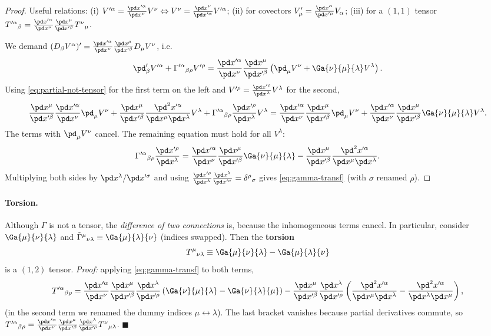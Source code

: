 \begin{proof}
Useful relations: (i) $V'^\alpha=\frac{\pd x'^\alpha}{\pd x^\nu}V^\nu\Leftrightarrow V^\nu=\frac{\pd x^\nu}{\pd x'^\alpha}V'^\alpha$; (ii) for covectors $V'_\mu=\frac{\pd x^\alpha}{\pd x'^\mu}V_\alpha$; (iii) for a $(1,1)$ tensor $T'^\alpha{}_\beta=\frac{\pd x'^\alpha}{\pd x^\nu}\frac{\pd x^\mu}{\pd x'^\beta}T^\nu{}_\mu$.

We demand $(D_\beta V^\alpha)'=\frac{\pd x'^\alpha}{\pd x^\nu}\frac{\pd x^\mu}{\pd x'^\beta}D_\mu V^\nu$, i.e.
\[
  \pd'_\beta V'^\alpha+\Gamma'^\alpha{}_{\beta\rho}V'^\rho
  =\frac{\pd x'^\alpha}{\pd x^\nu}\frac{\pd x^\mu}{\pd x'^\beta}\left(\pd_\mu V^\nu+\Ga{\nu}{\mu}{\lambda}V^\lambda\right).
\]
Using \eqref{eq:partial-not-tensor} for the first term on the left and $V'^\rho=\frac{\pd x'^\rho}{\pd x^\lambda}V^\lambda$ for the second,
\[
  \frac{\pd x^\mu}{\pd x'^\beta}\frac{\pd x'^\alpha}{\pd x^\nu}\pd_\mu V^\nu
  +\frac{\pd x^\mu}{\pd x'^\beta}\frac{\pd^2x'^\alpha}{\pd x^\mu\pd x^\lambda}V^\lambda
  +\Gamma'^\alpha{}_{\beta\rho}\frac{\pd x'^\rho}{\pd x^\lambda}V^\lambda
  =\frac{\pd x'^\alpha}{\pd x^\nu}\frac{\pd x^\mu}{\pd x'^\beta}\pd_\mu V^\nu+\frac{\pd x'^\alpha}{\pd x^\nu}\frac{\pd x^\mu}{\pd x'^\beta}\Ga{\nu}{\mu}{\lambda}V^\lambda .
\]
The terms with $\pd_\mu V^\nu$ cancel. The remaining equation must hold for all $V^\lambda$:
\[
  \Gamma'^\alpha{}_{\beta\rho}\frac{\pd x'^\rho}{\pd x^\lambda}
  =\frac{\pd x'^\alpha}{\pd x^\nu}\frac{\pd x^\mu}{\pd x'^\beta}\Ga{\nu}{\mu}{\lambda}-\frac{\pd x^\mu}{\pd x'^\beta}\frac{\pd^2x'^\alpha}{\pd x^\mu\pd x^\lambda}.
\]
Multiplying both sides by $\pd x^\lambda/\pd x'^\sigma$ and using $\frac{\pd x'^\rho}{\pd x^\lambda}\frac{\pd x^\lambda}{\pd x'^\sigma}=\delta^\rho{}_\sigma$ gives \eqref{eq:gamma-transf} (with $\sigma$ renamed $\rho$).
\end{proof}

\paragraph{Torsion.} Although $\Gamma$ is not a tensor, the \emph{difference of two connections} is, because the inhomogeneous terms cancel. In particular, consider $\Ga{\mu}{\nu}{\lambda}$ and $\tilde\Gamma^\mu{}_{\nu\lambda}\equiv\Ga{\mu}{\lambda}{\nu}$ (indices swapped). Then the \textbf{torsion}
\begin{equation}
  T^\mu{}_{\nu\lambda}\equiv\Ga{\mu}{\nu}{\lambda}-\Ga{\mu}{\lambda}{\nu}
\end{equation}
is a $(1,2)$ tensor. \textit{Proof:} applying \eqref{eq:gamma-transf} to both terms,
\[
  T'^\alpha{}_{\beta\rho}=\frac{\pd x'^\alpha}{\pd x^\nu}\frac{\pd x^\mu}{\pd x'^\beta}\frac{\pd x^\lambda}{\pd x'^\rho}\left(\Ga{\nu}{\mu}{\lambda}-\Ga{\nu}{\lambda}{\mu}\right)
  -\frac{\pd x^\mu}{\pd x'^\beta}\frac{\pd x^\lambda}{\pd x'^\rho}\left(\frac{\pd^2x'^\alpha}{\pd x^\mu\pd x^\lambda}-\frac{\pd^2x'^\alpha}{\pd x^\lambda\pd x^\mu}\right),
\]
(in the second term we renamed the dummy indices $\mu\leftrightarrow\lambda$). The last bracket vanishes because partial derivatives commute, so $T'^\alpha{}_{\beta\rho}=\frac{\pd x'^\alpha}{\pd x^\nu}\frac{\pd x^\mu}{\pd x'^\beta}\frac{\pd x^\lambda}{\pd x'^\rho}T^\nu{}_{\mu\lambda}$. $\blacksquare$

